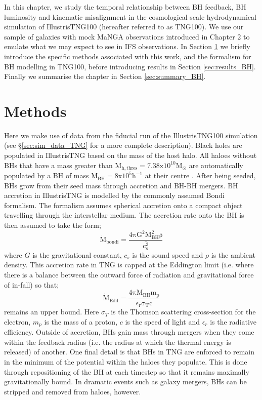In this chapter, we study the temporal relationship between BH feedback, BH luminosity and kinematic misalignment in the cosmological scale hydrodynamical simulation of IllustrisTNG100 (hereafter referred to as TNG100). We use our sample of galaxies with mock MaNGA observations introduced in Chapter 2 to emulate what we may expect to see in IFS observations. In Section \ref{sec:methods_BH} we briefly introduce the specific methods associated with this work, and the formalism for BH modelling in TNG100, before introducing results in Section \ref{sec:results_BH}. Finally we summarise the chapter in Section \ref{sec:summary_BH}.

\section{Methods} \label{sec:methods_BH}
Here we make use of data from the fiducial run of the IllustrisTNG100 simulation (see \S\ref{sec:sim_data_TNG} for a more complete description). Black holes are populated in IllustrisTNG based on the mass of the host halo. All haloes without BHs that have a mass greater than $\mathrm{M_{h,thres} = 7.38 x 10^{10} M_{\odot} }$ are automatically populated by a BH of mass $\mathrm{M_{BH} = 8 x 10^{5} h^{-1}}$ at their centre \citep[termed halo-based BH formation, see also;][]{sijacki2009, dimatteo2012, hirschmann2014, sijacki2015}. After being seeded, BHs grow from their seed mass through accretion and BH-BH mergers. BH accretion in IllustrisTNG is modelled by the commonly assumed Bondi formalism. The formalism assumes spherical accretion onto a compact object travelling through the interstellar medium. The accretion rate onto the BH is then assumed to take the form;
\begin{equation}
\mathrm{\dot{M}_{bondi} = \frac{4\pi G^{2} M_{BH}^{2} \bar{\rho}}{\bar{c^{3}_{s}}}}
\end{equation}
where $G$ is the gravitational constant, $c_{s}$ is the sound speed and $\rho$ is the ambient density. This accretion rate in TNG is capped at the Eddington limit (i.e. where there is a balance between the outward force of radiation and gravitational force of in-fall) so that;
\begin{equation}
\mathrm{\dot{M}_{Edd} = \frac{4\pi M_{BH} m_p}{\epsilon_r \sigma_T c} }
\end{equation}
remains an upper bound. Here $\sigma_T$ is the Thomson scattering cross-section for the electron, $m_p$ is the mass of a proton, $c$ is the speed of light and $\epsilon_r$ is the radiative efficiency. Outside of accretion, BHs gain mass through mergers when they come within the feedback radius (i.e. the radius at which the thermal energy is released) of another. One final detail is that BHs in TNG are enforced to remain in the minimum of the potential within the haloes they populate. This is done through repositioning of the BH at each timestep so that it remains maximally gravitationally bound. In dramatic events such as galaxy mergers, BHs can be stripped and removed from haloes, however. 

